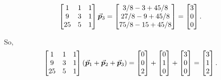 \documentclass[MathsNotesBase.tex]{subfiles}
\begin{document}
{\begin{itemize}
{\[				\begin{bmatrix}
				1 & 1 & 1\\
				9 & 3 & 1\\
				25 & 5 & 1
				\end{bmatrix}
				\vec{\bm{p}}_3 =
				\begin{bmatrix}
				3/8 - 3 + 45/8\\
				27/8 - 9 + 45/8\\
				75/8 - 15 + 45/8
				\end{bmatrix} =
				\begin{bmatrix}3\\0\\0\end{bmatrix}.
			\]
		}
	\end{itemize}
	So,
	\[ \begin{bmatrix}
		1 & 1 & 1\\
		9 & 3 & 1\\
		25 & 5 & 1
		\end{bmatrix}
		(\vec{\bm{p}}_1 + \vec{\bm{p}}_2 + \vec{\bm{p}}_3)
		 = 
		\begin{bmatrix}0\\0\\2\end{bmatrix} + \begin{bmatrix}0\\1\\0\end{bmatrix} + \begin{bmatrix}3\\0\\0\end{bmatrix}
		= 
		\begin{bmatrix}3\\1\\2\end{bmatrix}.
	\]
}
\end{document}
